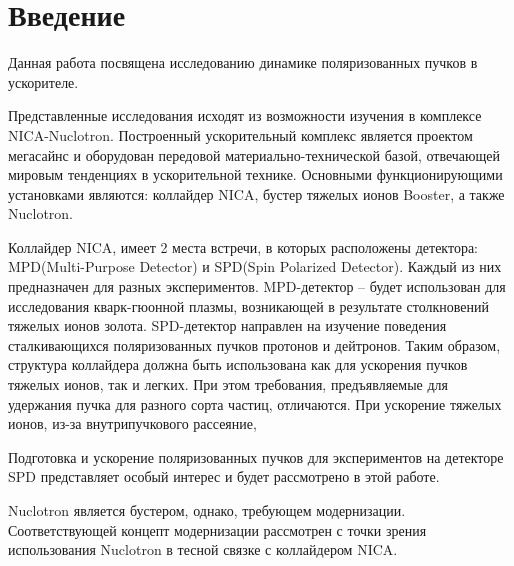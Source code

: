 \chapter*{Введение}                         %

\newcommand{\actuality}{}
\newcommand{\progress}{}
\newcommand{\aim}{{\textbf\aimTXT}}
\newcommand{\tasks}{\textbf{\tasksTXT}}
\newcommand{\novelty}{\textbf{\noveltyTXT}}
\newcommand{\influence}{\textbf{\influenceTXT}}
\newcommand{\methods}{\textbf{\methodsTXT}}
\newcommand{\defpositions}{\textbf{\defpositionsTXT}}
\newcommand{\reliability}{\textbf{\reliabilityTXT}}
\newcommand{\probation}{\textbf{\probationTXT}}
\newcommand{\contribution}{\textbf{\contributionTXT}}
\newcommand{\publications}{\textbf{\publicationsTXT}}

Данная работа посвящена исследованию динамике поляризованных пучков в ускорителе. 

Представленные исследования исходят из возможности изучения в комплексе NICA-Nuclotron. Построенный ускорительный комплекс является проектом мегасайнс и оборудован передовой материально-технической базой, отвечающей мировым тенденциях в ускорительной технике. Основными функционирующими установками являются: коллайдер NICA, бустер тяжелых ионов Booster, а также Nuclotron. 
\par Коллайдер NICA, имеет 2 места встречи, в которых расположены детектора: MPD(Multi-Purpose Detector) и SPD(Spin Polarized Detector). Каждый из них предназначен для разных экспериментов. MPD-детектор – будет использован для исследования кварк-гюонной плазмы, возникающей в результате столкновений тяжелых ионов золота. SPD-детектор направлен на изучение поведения сталкивающихся поляризованных пучков протонов и дейтронов. Таким образом, структура коллайдера должна быть использована как для ускорения пучков тяжелых ионов, так и легких. При этом требования, предъявляемые для удержания пучка для разного сорта частиц, отличаются. При ускорение тяжелых ионов, из-за внутрипучкового рассеяние, 

Подготовка и ускорение поляризованных пучков для экспериментов на детекторе SPD представляет особый интерес и будет рассмотрено в этой работе. 

Nuclotron является бустером, однако, требующем модернизации. Соответствующей концепт модернизации рассмотрен с точки зрения использования Nuclotron в тесной связке с коллайдером NICA. 


